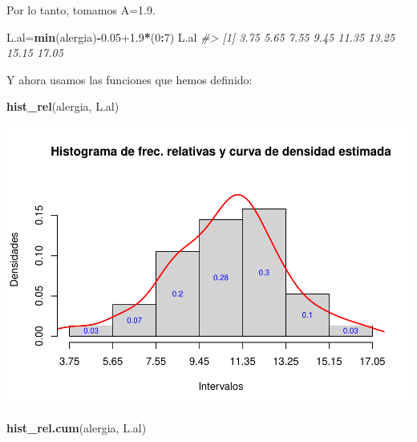 \documentclass[
]{book}
\newenvironment{Shaded}{\begin{snugshade}}{\end{snugshade}}
\newcommand{\CommentTok}[1]{\textcolor[rgb]{0.56,0.35,0.01}{\textit{#1}}}
\newcommand{\DecValTok}[1]{\textcolor[rgb]{0.00,0.00,0.81}{#1}}
\newcommand{\FloatTok}[1]{\textcolor[rgb]{0.00,0.00,0.81}{#1}}
\newcommand{\KeywordTok}[1]{\textcolor[rgb]{0.13,0.29,0.53}{\textbf{#1}}}
\newcommand{\NormalTok}[1]{#1}
\newcommand{\OperatorTok}[1]{\textcolor[rgb]{0.81,0.36,0.00}{\textbf{#1}}}
\theoremstyle{definition}
\theoremstyle{definition}
\theoremstyle{definition}
\theoremstyle{remark}
\begin{document}
Por lo tanto, tomamos A=1.9.

\begin{Shaded}
\begin{Highlighting}[]
\NormalTok{L.al=}\KeywordTok{min}\NormalTok{(alergia)}\OperatorTok{{-}}\FloatTok{0.05+1.9}\OperatorTok{*}\NormalTok{(}\DecValTok{0}\OperatorTok{:}\DecValTok{7}\NormalTok{) }
\NormalTok{L.al}
\CommentTok{\#\textgreater{} [1]  3.75  5.65  7.55  9.45 11.35 13.25 15.15 17.05}
\end{Highlighting}
\end{Shaded}

Y ahora usamos las funciones que hemos definido:

\begin{Shaded}
\begin{Highlighting}[]
\KeywordTok{hist\_rel}\NormalTok{(alergia, L.al)}
\end{Highlighting}
\end{Shaded}

\begin{center}\includegraphics[width=0.9\linewidth]{13chap13_Agrupados_files/figure-latex/unnamed-chunk-88-1} \end{center}

\begin{Shaded}
\begin{Highlighting}[]
\KeywordTok{hist\_rel.cum}\NormalTok{(alergia, L.al)}
\end{Highlighting}
\end{Shaded}
\end{document}

